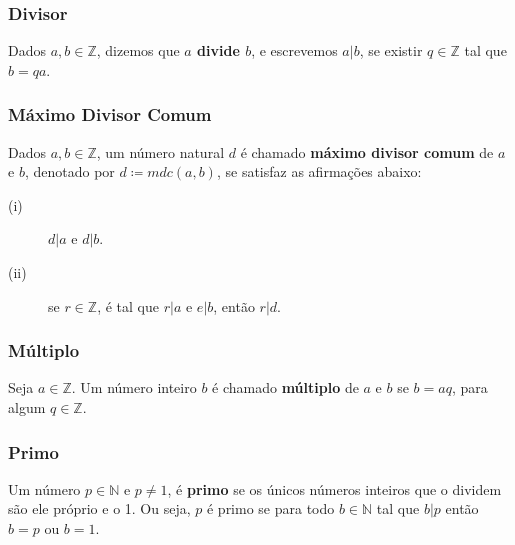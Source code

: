 \subsubsection*{Divisor}
Dados $a, b \in \mathbb{Z}$, dizemos que \textbf{$a$ divide $b$}, e escrevemos $a|b$, se existir $q \in \mathbb{Z}$ tal que $b = qa$.

\subsubsection*{Máximo Divisor Comum}
Dados $a, b \in \mathbb{Z}$, um número natural $d$ é chamado \textbf{máximo divisor comum} de  $a$ e $b$, denotado por $d \coloneqq mdc(a, b)$, se satisfaz as afirmações abaixo:
    \begin{description}
        \item[(i)] $d|a$ e $d|b$.
        \item[(ii)] se $r \in \mathbb{Z}$, é tal que $r|a$ e $e|b$, então $r|d$.
    \end{description}

\subsubsection*{Múltiplo}
Seja $a \in \mathbb{Z}$. Um número inteiro $b$ é chamado \textbf{múltiplo} de $a$ e $b$ se $b=aq$, para algum $q \in \mathbb{Z}$.

\subsubsection*{Primo}
Um número $p \in \mathbb{N}$ e $p \neq 1$, é \textbf{primo} se os únicos números inteiros que o dividem são ele próprio e o 1. Ou seja, $p$ é primo se para todo $b \in \mathbb{N}$ tal que $b|p$ então $b=p$ ou $b=1$.


